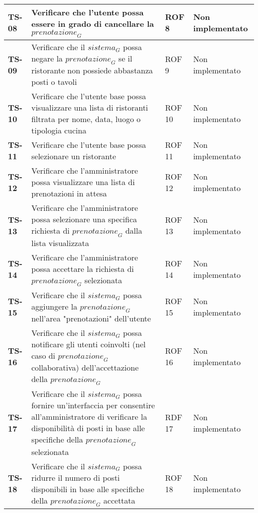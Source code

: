\begin{longtable}{|>{\centering\arraybackslash}p{1.5cm}|p{9.8cm}|p{2cm}|p{3.5cm}|}
    \hline
    \rowcolor{gray!10}
    \textbf{TS-08} & Verificare che l'utente possa essere in grado di cancellare la $\textit{prenotazione}_G$ & ROF 8 & Non implementato \\ 
    \hline
    \rowcolor{gray!10}
    \textbf{TS-09} & Verificare che il $\textit{sistema}_G$ possa negare la $\textit{prenotazione}_G$ se il ristorante non possiede abbastanza posti o tavoli & ROF 9 & Non implementato \\ 
    \hline
    \rowcolor{gray!10}
    \textbf{TS-10} & Verificare che l'utente base possa visualizzare una lista di ristoranti filtrata per nome, data, luogo o tipologia cucina & ROF 10 & Non implementato \\ 
    \hline
    \rowcolor{gray!10}
    \textbf{TS-11} & Verificare che l'utente base possa selezionare un ristorante & ROF 11 & Non implementato \\ 
    \hline
    \rowcolor{gray!10}
    \textbf{TS-12} & Verificare che l'amministratore possa visualizzare una lista di prenotazioni in attesa & ROF 12 & Non implementato \\
    \hline
    \rowcolor{gray!10}
    \textbf{TS-13} & Verificare che l'amministratore possa selezionare una specifica richiesta di $\textit{prenotazione}_G$ dalla lista visualizzata & ROF 13 & Non implementato \\ 
    \hline
    \rowcolor{gray!10}
    \textbf{TS-14} & Verificare che l'amministratore possa accettare la richiesta di $\textit{prenotazione}_G$ selezionata & ROF 14 & Non implementato \\ 
    \hline
    \rowcolor{gray!10}
    \textbf{TS-15} & Verificare che il $\textit{sistema}_G$ possa aggiungere la $\textit{prenotazione}_G$ nell'area "prenotazioni" dell'utente & ROF 15 & Non implementato \\
    \hline
    \rowcolor{gray!10}
    \textbf{TS-16} & Verificare che il $\textit{sistema}_G$ possa notificare gli utenti coinvolti (nel caso di $\textit{prenotazione}_G$ collaborativa) dell'accettazione della $\textit{prenotazione}_G$ & ROF 16 & Non implementato \\ 
    \hline
    \rowcolor{gray!10}
    \textbf{TS-17} & Verificare che il $\textit{sistema}_G$ possa fornire un'interfaccia per consentire all'amministratore di verificare la disponibilità di posti in base alle specifiche della $\textit{prenotazione}_G$ selezionata & RDF 17 & Non implementato \\ 
    \hline
    \rowcolor{gray!10}
    \textbf{TS-18} & Verificare che il $\textit{sistema}_G$ possa ridurre il numero di posti disponibili in base alle specifiche della $\textit{prenotazione}_G$ accettata & ROF 18 & Non implementato \\ 

\end{longtable}
